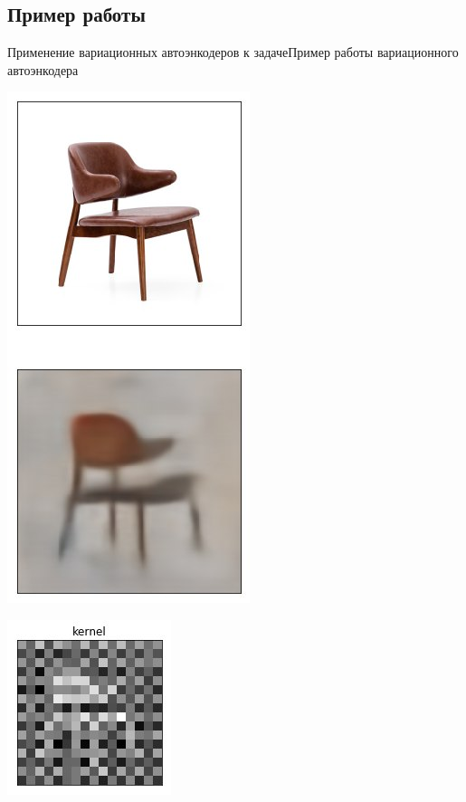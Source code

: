 \documentclass{beamer}
\begin{document}
\subsection{Пример работы}

\begin{frame}{Применение вариационных автоэнкодеров к задаче}{Пример работы вариационного автоэнкодера}

\begin{minipage}{0.3\textwidth}
\begin{flushleft}
\includegraphics[scale=0.37]{stul}
\end{flushleft}
\end{minipage}
\hfill
\begin{minipage}{0.5\textwidth}
\begin{flushleft}
\includegraphics[scale=0.5]{stul_kernel}
\end{flushleft}
\end{minipage}

\end{frame}
\end{document}
